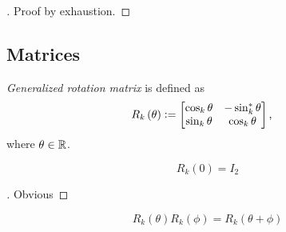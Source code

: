 \documentclass[stu, babel, american, biblatex, a4paper, leqno, draftall]{apa7}
\begin{document}
\begin{proof}[]
    Proof by exhaustion.
\end{proof}
\subsection{Matrices}
\begin{definition}\label{M:Rotation}
    \textit{Generalized rotation matrix} is defined as
    \begin{align*}
        R_k\left(\theta\right) & \vcentcolon=
        \begin{bmatrix}
            \cos_k{\theta}  & -\sin_k^\ast{\theta} \\
            \sin_k{\theta} & \cos_k{\theta} \\
        \end{bmatrix}\text{,}
    \end{align*}
    where $\theta\in\mathbb{R}$.
\end{definition}
\begin{corollary}\label{M:Rotation:Identity}
\begin{equation*}
    R_k\left(0\right)
    =
    I_2
\end{equation*}
\end{corollary}
\begin{proof}[]
Obvious
\end{proof}
\begin{corollary}\label{M:Rotation:Sum}
\begin{equation*}
	R_k\left(\theta\right)R_k\left(\phi\right)=R_k\left(\theta+\phi\right)
\end{equation*}
\end{corollary}
\end{document}
